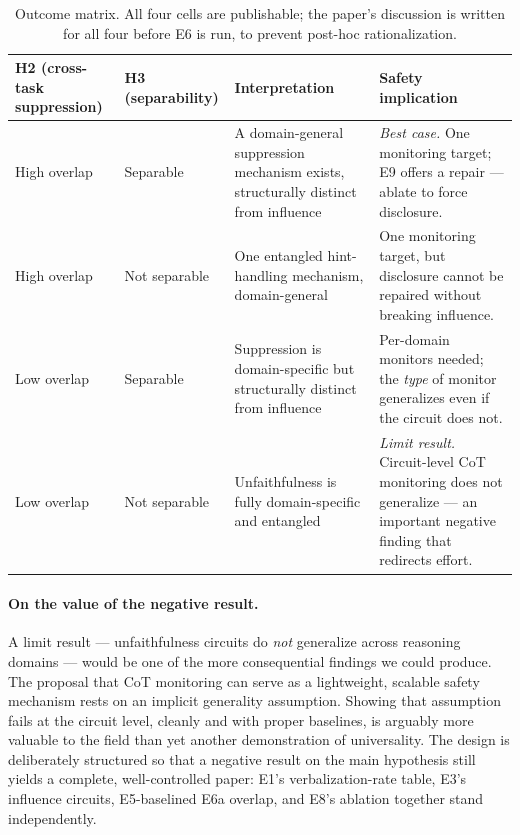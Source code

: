 \documentclass[11pt]{article}
\begin{document}
\begin{table}[h]
\centering
\small
\begin{tabular}{p{3cm} p{3cm} p{4.5cm} p{4cm}}
\toprule
\textbf{H2 (cross-task suppression)} & \textbf{H3 (separability)} & \textbf{Interpretation} & \textbf{Safety implication} \\
\midrule
High overlap & Separable &
A domain-general suppression mechanism exists, structurally distinct from influence &
\emph{Best case.} One monitoring target; E9 offers a repair --- ablate to force disclosure. \\
\addlinespace
High overlap & Not separable &
One entangled hint-handling mechanism, domain-general &
One monitoring target, but disclosure cannot be repaired without breaking influence. \\
\addlinespace
Low overlap & Separable &
Suppression is domain-specific but structurally distinct from influence &
Per-domain monitors needed; the \emph{type} of monitor generalizes even if the circuit does not. \\
\addlinespace
Low overlap & Not separable &
Unfaithfulness is fully domain-specific and entangled &
\emph{Limit result.} Circuit-level CoT monitoring does not generalize --- an important negative finding that redirects effort. \\
\bottomrule
\end{tabular}
\caption{Outcome matrix. All four cells are publishable; the paper's discussion is written for all four before E6 is run, to prevent post-hoc rationalization.}
\label{tab:outcomes}
\end{table}

\paragraph{On the value of the negative result.} A limit result --- unfaithfulness circuits do \emph{not} generalize across reasoning domains --- would be one of the more consequential findings we could produce. The proposal that CoT monitoring can serve as a lightweight, scalable safety mechanism rests on an implicit generality assumption. Showing that assumption fails at the circuit level, cleanly and with proper baselines, is arguably more valuable to the field than yet another demonstration of universality. The design is deliberately structured so that a negative result on the main hypothesis still yields a complete, well-controlled paper: E1's verbalization-rate table, E3's influence circuits, E5-baselined E6a overlap, and E8's ablation together stand independently.
\end{document}

